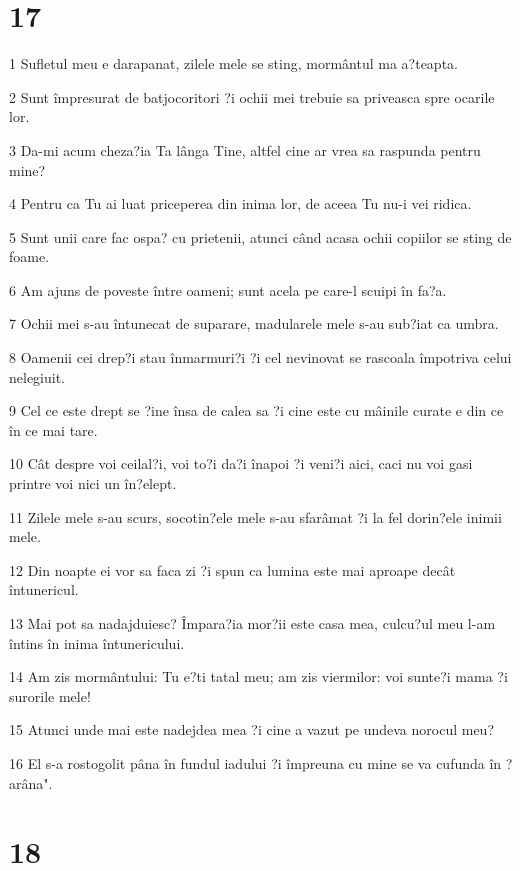 \chapter{17}

\par 1 Sufletul meu e darapanat, zilele mele se sting, mormântul ma a?teapta.
\par 2 Sunt împresurat de batjocoritori ?i ochii mei trebuie sa priveasca spre ocarile lor.
\par 3 Da-mi acum cheza?ia Ta lânga Tine, altfel cine ar vrea sa raspunda pentru mine?
\par 4 Pentru ca Tu ai luat priceperea din inima lor, de aceea Tu nu-i vei ridica.
\par 5 Sunt unii care fac ospa? cu prietenii, atunci când acasa ochii copiilor se sting de foame.
\par 6 Am ajuns de poveste între oameni; sunt acela pe care-l scuipi în fa?a.
\par 7 Ochii mei s-au întunecat de suparare, madularele mele s-au sub?iat ca umbra.
\par 8 Oamenii cei drep?i stau înmarmuri?i ?i cel nevinovat se rascoala împotriva celui nelegiuit.
\par 9 Cel ce este drept se ?ine însa de calea sa ?i cine este cu mâinile curate e din ce în ce mai tare.
\par 10 Cât despre voi ceilal?i, voi to?i da?i înapoi ?i veni?i aici, caci nu voi gasi printre voi nici un în?elept.
\par 11 Zilele mele s-au scurs, socotin?ele mele s-au sfarâmat ?i la fel dorin?ele inimii mele.
\par 12 Din noapte ei vor sa faca zi ?i spun ca lumina este mai aproape decât întunericul.
\par 13 Mai pot sa nadajduiesc? Împara?ia mor?ii este casa mea, culcu?ul meu l-am întins în inima întunericului.
\par 14 Am zis mormântului: Tu e?ti tatal meu; am zis viermilor: voi sunte?i mama ?i surorile mele!
\par 15 Atunci unde mai este nadejdea mea ?i cine a vazut pe undeva norocul meu?
\par 16 El s-a rostogolit pâna în fundul iadului ?i împreuna cu mine se va cufunda în ?arâna".

\chapter{18}


